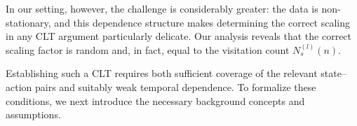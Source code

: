 \documentclass[twoside,11pt]{article}
\newcommand{\pow}[1]{^{(#1)}}%
\numberwithin{equation}{section}
\newcommand{\lp}{\left(}
\newcommand{\rp}{\right)}
\newcommand{\History}{\mathcal{H}}
\newcommand{\history}{\hbar}
\newcommand{\Ibb}{\mathbb{I}}
\begin{document}
In our setting, however, the challenge is considerably greater: the data is non-stationary, and this dependence structure makes determining the correct scaling in any CLT argument particularly delicate.
Our analysis reveals that the correct scaling factor is random and, in fact, equal to the visitation count $N_s \pow l(n)$.

Establishing such a CLT requires both sufficient coverage of the relevant state–action pairs and suitably weak temporal dependence. 
To formalize these conditions, we next introduce the necessary background concepts and assumptions.


\end{document}
